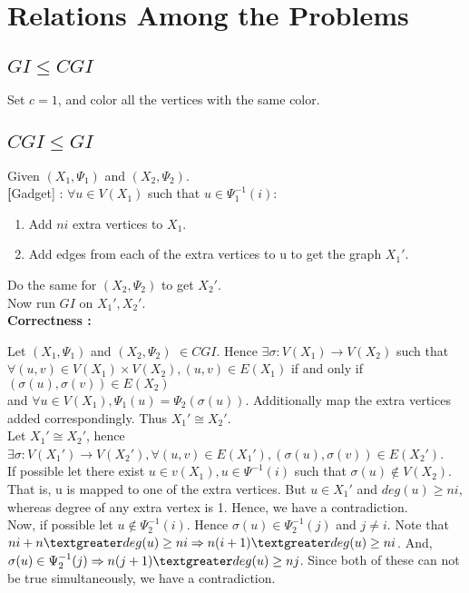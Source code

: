 \section{Relations Among the Problems}

\subsection{$GI \le CGI$}
	Set $c=1$, and color all the vertices with the same color.

\subsection{$CGI \le GI$}
Given $(X_1,\Psi_1)$ and $(X_2,\Psi_2)$.\\
\textbf[Gadget] : $\forall u \in V(X_1)$ such that $u \in \Psi_1^{-1}(i)$:
\begin{enumerate}
\item Add $ni$ extra vertices to $X_1$.
\item Add edges from each of the extra vertices to u to get the graph $X_1'$.
\end{enumerate}
Do the same for $(X_2,\Psi_2)$ to get $X_2'$.\\
Now run $GI$ on $X_1',X_2'$.\\

\textbf{Correctness :}

Let $(X_1,\Psi_1)$ and $(X_2,\Psi_2)$ $\in CGI$. Hence $\exists \sigma : V(X_1) \rightarrow V(X_2)$ such that 
$\forall (u,v) \in V(X_1)\times V(X_2), (u,v) \in E(X_1)$ if and only if $(\sigma(u), \sigma(v)) \in E(X_2) $\\
 and $\forall u \in V(X_1) , \Psi_1(u) = \Psi_2(\sigma(u))$. Additionally map the extra vertices added correspondingly. Thus $X_1' \cong X_2'$.
\\

Let $X_1' \cong X_2'$, hence $ \exists \sigma : V(X_1') \rightarrow V(X_2'), \forall (u,v) \in E(X_1'), (\sigma(u),\sigma(v)) \in E(X_2')$.\\
If possible let there exist $ u \in v(X_1), u \in \Psi^{-1}(i)$ such that $\sigma(u) \notin V(X_2)$. That is, u is mapped to one of the extra vertices. But $u \in X_1'$ and $deg(u) \ge ni$, whereas degree of any extra vertex is 1. Hence, we have a contradiction.\\

Now, if possible let $u \notin \Psi_2^{-1}(i)$. Hence $\sigma(u) \in \Psi_2^{-1}(j)$ and $j \neq i$.
Note that $ni + n \textgreater deg(u) \ge ni \implies n(i+1) \textgreater deg(u) \ge ni$.
And, $\sigma(u) \in \Psi_2^{-1}(j) \implies n(j+1) \textgreater deg(u) \ge nj$. Since both of these can not be true simultaneously, we have a contradiction.\\

